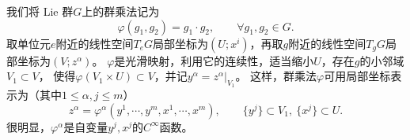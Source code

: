 我们将 Lie 群$G$上的群乘法记为
\begin{equation}
    \varphi(g_1,g_2)=g_1\cdot g_2 , \qquad \forall g_1 , g_2 \in G.
\end{equation}
取单位元$e$附近的线性空间$T_eG$局部坐标为$(U;x^i)$，再取$g$附近的线性空间$T_gG$局部坐标为$(V;z^\alpha)$。
$\varphi$是光滑映射，利用它的连续性，适当缩小$U$，存在$g$的小邻域$V_1\subset V$，
使得$\varphi(V_1\times U)\subset V$，并记$y^\alpha=z^\alpha|_{V_1}$。
这样，群乘法$\varphi$可用局部坐标表示为（其中$ 1\leqslant \alpha,j \leqslant m$）
\begin{equation}\label{chlg:eqn_z=xy}
    z^\alpha=\varphi^\alpha(y^1,\cdots,y^m, x^1,\cdots,x^m),\qquad
    \{y^j\}\subset V_1,\  \{x^j\}\subset U. 
\end{equation}
很明显，$\varphi^\alpha$是自变量$y^j,x^j$的$C^\infty$函数。

